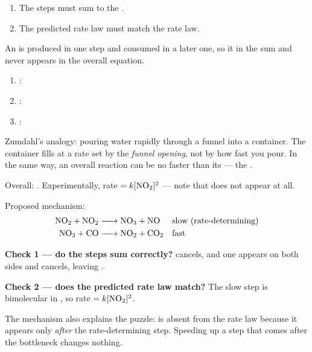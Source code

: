 \documentclass{apchem-notes}
\begin{document}

\begin{enumerate}[leftmargin=*,itemsep=0.2em]
  \item The steps must sum to the .
  \item The predicted rate law must match the
         rate law.
\end{enumerate}

An  is produced in one step and consumed in a later one,
so it  in the sum and never appears in the
overall equation.


\begin{enumerate}[leftmargin=*,itemsep=0.3em]
  \item {}: 
  \item {}:
  \item {}:
\end{enumerate}



\begin{apcnote}
Zumdahl's analogy: pouring water rapidly through a funnel into a container.
The container fills at a rate set by the \emph{funnel opening}, not by how
fast you pour. In the same way, an overall reaction can be no faster than
its  --- the
.
\end{apcnote}

\begin{workedexample}
Overall: .
Experimentally, rate $= k[\ce{NO2}]^2$ --- note that  does not appear
at all.

Proposed mechanism:
\begin{align*}
  \ce{NO2 + NO2 &-> NO3 + NO} &&\text{slow (rate-determining)}\\
  \ce{NO3 + CO &-> NO2 + CO2} &&\text{fast}
\end{align*}

\textbf{Check 1 --- do the steps sum correctly?}  cancels, and one
 appears on both sides and cancels, leaving
. \checkmark

\textbf{Check 2 --- does the predicted rate law match?} The slow step is
bimolecular in , so rate $= k[\ce{NO2}]^2$. \checkmark

The mechanism also explains the puzzle:  is absent from the rate law
because it appears only \emph{after} the rate-determining step. Speeding up
a step that comes after the bottleneck changes nothing.
\end{workedexample}
\end{document}
